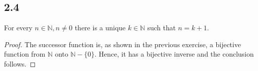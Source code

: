 \subsection*{2.4} For every $n \in \mathbb{N}, n\neq 0$ there is a unique $k \in \mathbb{N}$ such that $n = k+1$.

\begin{proof}
The successor function is, as shown in the previous exercise, a bijective function from $\mathbb{N}$ onto $\mathbb{N} - \{0\}$. Hence, it has a bijective inverse and the conclusion follows.
\end{proof}

